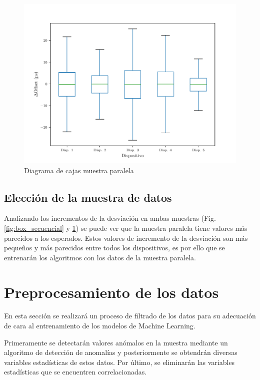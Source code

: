 \begin{figure}
    \centering
    \includegraphics[scale=0.7]{../Python/plots/parallel/boxplot_no_out}
    \caption{Diagrama de cajas muestra paralela}
    \label{fig:box_paralelo}
\end{figure}

\subsection{Elección de la muestra de datos}

Analizando los incrementos de la desviación en ambas muestras (Fig. \ref{fig:box_secuencial} y \ref{fig:box_paralelo}) se puede ver que la muestra paralela tiene valores más parecidos a los esperados. Estos valores de incremento de la desviación son más pequeños y más parecidos entre todos los dispositivos, es por ello que se entrenarán los algoritmos con los datos de la muestra paralela.

\section{Preprocesamiento de los datos}

En esta sección se realizará un proceso de filtrado de los datos para su adecuación de cara al entrenamiento de los modelos de Machine Learning. 

Primeramente se detectarán valores anómalos en la muestra mediante un algoritmo de detección de anomalías y posteriormente se obtendrán diversas variables estadísticas de estos datos. Por último, se eliminarán las variables estadísticas que se encuentren correlacionadas.

